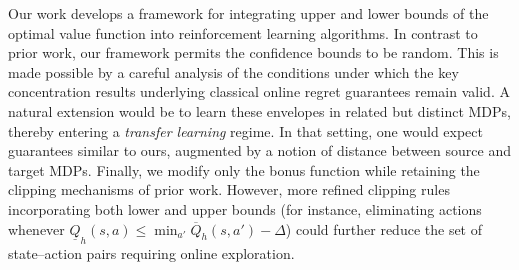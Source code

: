 \documentclass[twoside]{article}
\begin{document}

Our work develops a framework for integrating upper and lower bounds of the optimal value function into reinforcement learning algorithms. In contrast to prior work, our framework permits the confidence bounds to be random. This is made
possible by a careful analysis of the conditions under which the key concentration results
underlying classical online regret guarantees remain valid. A natural extension would be to learn these
envelopes in related but distinct MDPs, thereby entering a \emph{transfer learning} regime. In that
setting, one would expect guarantees similar to ours, augmented by a notion of distance between 
source and target MDPs. Finally, we modify only the bonus function while retaining the clipping
mechanisms of prior work. However, more refined clipping rules incorporating both lower and upper bounds (for instance, eliminating actions whenever $\underline{Q}_h(s,a) \le \min_{a'}\overline{Q}_h(s,a') - \Delta$) could further reduce the set of state–action pairs requiring online
exploration.

\end{document}
